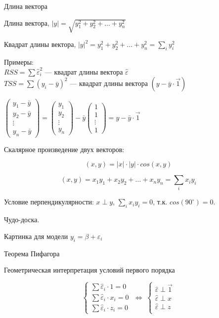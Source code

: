 \documentclass[ignorenonframetext,]{beamer}
\begin{document}
\begin{frame}{Длина вектора}

Длина вектора, $|y|=\sqrt{y_1^2+y_2^2+\ldots+ y_n^2}$

Квадрат длины вектора, $|y|^2=y_1^2+y_2^2+\ldots + y_n^2=\sum_i y_i^2$

Примеры:\\$RSS=\sum \hat{\varepsilon}_i^2$ --- квадрат длины вектора
$\hat{\varepsilon}$\\$TSS=\sum (y_i-\bar{y})^2$ --- квадрат длины
вектора $(y-\bar{y}\cdot \vec{1})$

$\begin{pmatrix} y_1-\bar{y} \\ y_2-\bar{y} \\ \vdots \\ y_n-\bar{y}  \end{pmatrix} = \begin{pmatrix} y_1 \\ y_2 \\ \vdots \\ y_n  \end{pmatrix} - \bar{y}\begin{pmatrix} 1 \\ 1 \\ \vdots \\ 1  \end{pmatrix}=y-\bar{y}\cdot \vec{1}$

\end{frame}

\begin{frame}{Скалярное произведение двух векторов:}

\[
(x,y)=|x|\cdot |y|\cdot cos(x,y)
\]

\[
(x,y)=x_1 y_1 +x_2 y_2 +\ldots+ x_n y_n=\sum_i x_i y_i
\]

Условие перпендикулярности: $x \perp y$, $\sum_i x_i y_i=0$, т.к.
$cos(90^\circ)=0$.

\end{frame}

\begin{frame}{Чудо-доска.}

Картинка для модели $y_i=\beta + \varepsilon_i$

Теорема Пифагора

\end{frame}

\begin{frame}{Геометрическая интерпретация условий первого порядка}

\[
\begin{cases}
\sum \hat{\varepsilon}_i \cdot 1 =0 \\
\sum \hat{\varepsilon}_i \cdot x_i =0 \\
\sum \hat{\varepsilon}_i \cdot z_i =0
\end{cases}\; \Leftrightarrow \;
\begin{cases}
\hat{\varepsilon}\perp \vec{1} \\
\hat{\varepsilon}\perp x \\
\hat{\varepsilon}\perp z \\
\end{cases}
\]

\end{frame}
\end{document}
